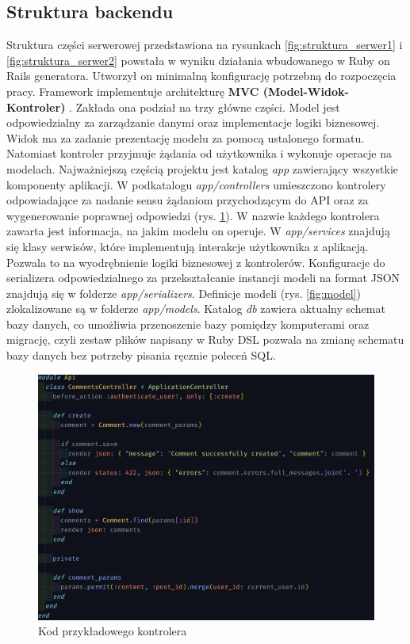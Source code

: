 \documentclass[declaration,shortabstract,polish,inz]{iithesis}
\begin{document}
\subsection{Struktura backendu}
Struktura części serwerowej przedstawiona na rysunkach \ref{fig:struktura_serwer1} i \ref{fig:struktura_serwer2} powstała w wyniku działania wbudowanego w Ruby on Rails generatora. Utworzył on minimalną konfigurację potrzebną do rozpoczęcia pracy. Framework implementuje architekturę \textbf{MVC (Model-Widok-Kontroler)} \cite{rortutorial}. Zakłada ona podział na trzy główne części. Model jest odpowiedzialny za zarządzanie danymi oraz implementacje logiki biznesowej. Widok ma za zadanie prezentację modelu za pomocą ustalonego formatu. Natomiast kontroler przyjmuje żądania od użytkownika i wykonuje operacje na modelach. Najważniejszą częścią projektu jest katalog \textit{app} zawierający wszystkie komponenty aplikacji. W podkatalogu \textit{app/controllers} umieszczono kontrolery odpowiadające za nadanie sensu żądaniom przychodzącym do API oraz za wygenerowanie poprawnej odpowiedzi (rys. \ref{fig:kontroler}). W nazwie każdego kontrolera zawarta jest informacja, na jakim modelu on operuje. W \textit{app/services} znajdują się klasy serwisów, które implementują interakcje użytkownika z aplikacją. Pozwala to na wyodrębnienie logiki biznesowej z kontrolerów. Konfiguracje do serializera odpowiedzialnego za przekształcanie instancji modeli na format JSON znajdują się w folderze \textit{app/serializers}. Definicje modeli (rys. \ref{fig:model}) zlokalizowane są w folderze \textit{app/models}. Katalog \textit{db} zawiera aktualny schemat bazy danych, co umożliwia przenoszenie bazy pomiędzy komputerami oraz migrację, czyli zestaw plików napisany w Ruby DSL pozwala na zmianę schematu bazy danych bez potrzeby pisania ręcznie poleceń SQL.
\begin{figure}
    \centering
    \includegraphics[width=\textwidth]{images/kontroler.png}
    \caption{Kod przykładowego kontrolera}
    \label{fig:kontroler}
\end{figure}
\end{document}
